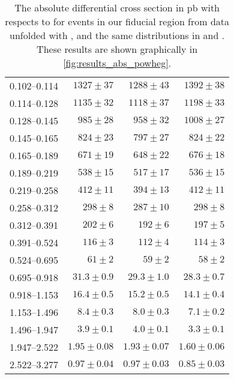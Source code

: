 \begin{table}
\begin{center}
\begin{tabular}{@{}l r r r@{}}
            0.102--0.114  &  $1327  \pm  37$    &  $1288  \pm  43$    &  $1392  \pm  38$    \\
            0.114--0.128  &  $1135  \pm  32$    &  $1118  \pm  37$    &  $1198  \pm  33$    \\
            0.128--0.145  &  $985   \pm  28$    &  $958   \pm  32$    &  $1008  \pm  27$    \\
            0.145--0.165  &  $824   \pm  23$    &  $797   \pm  27$    &  $824   \pm  22$    \\
            0.165--0.189  &  $671   \pm  19$    &  $648   \pm  22$    &  $676   \pm  18$    \\
            0.189--0.219  &  $538   \pm  15$    &  $517   \pm  17$    &  $536   \pm  15$    \\
            0.219--0.258  &  $412   \pm  11$    &  $394   \pm  13$    &  $412   \pm  11$    \\
            0.258--0.312  &  $298   \pm  8$     &  $287   \pm  10$    &  $298   \pm  8$     \\
            0.312--0.391  &  $202   \pm  6$     &  $192   \pm  6$     &  $197   \pm  5$     \\
            0.391--0.524  &  $116   \pm  3$     &  $112   \pm  4$     &  $114   \pm  3$     \\
            0.524--0.695  &  $61    \pm  2$     &  $59    \pm  2$     &  $58    \pm  2$     \\
            0.695--0.918  &  $31.3  \pm  0.9$   &  $29.3  \pm  1.0$   &  $28.3  \pm  0.7$   \\
            0.918--1.153  &  $16.4  \pm  0.5$   &  $15.2  \pm  0.5$   &  $14.1  \pm  0.4$   \\
            1.153--1.496  &  $8.4   \pm  0.3$   &  $8.0   \pm  0.3$   &  $7.1   \pm  0.2$   \\
            1.496--1.947  &  $3.9   \pm  0.1$   &  $4.0   \pm  0.1$   &  $3.3   \pm  0.1$   \\
            1.947--2.522  &  $1.95  \pm  0.08$  &  $1.93  \pm  0.07$  &  $1.60  \pm  0.06$  \\
            2.522--3.277  &  $0.97  \pm  0.04$  &  $0.97  \pm  0.03$  &  $0.85  \pm  0.03$  \\
            \bottomrule
        \end{tabular}
    \end{center}
    \caption[
        The absolute differential cross section in \si{\pico\barn} with
        respects to \phistar for \Ztoee events in our fiducial region from data
        unfolded with \PPsixZtwo.
    ]{
        The absolute differential cross section in \si{\pico\barn} with
        respects to \phistar for \Ztoee events in our fiducial region from data
        unfolded with \PPsixZtwo, and the same distributions in \MADGRAPH and
        \PPsixZtwo. These results are shown graphically in
        \cref{fig:results_abs_powheg}.
    }
    \label{tab:results_abs_powheg}
\end{table}
